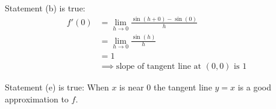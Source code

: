 \documentclass[nooutcomes]{ximera}
\renewenvironment{freeResponse}{
\ifhandout\setbox0\vbox\bgroup\else
\begin{trivlist}\item[\hskip \labelsep\bfseries Solution:\hspace{2ex}]
\fi}
{\ifhandout\egroup\else
\end{trivlist}
\fi}
\begin{document}
\begin{problem}
\begin{itemize}
\begin{freeResponse}
        Statement (b) is true:
        \begin{align*}
          f'(0) &= \lim_{h \to 0} \frac{\sin (h + 0) - \sin (0)}{h} \\
                &= \lim_{h \to 0} \frac{\sin (h)}{h} \\
                &= 1\\
          &\implies \mbox{slope of tangent line at $(0,0)$ is $1$}
        \end{align*}

        Statement (e) is true:
        When $x$ is near $0$ the tangent line $y = x$ is a good approximation to $f$.
      \end{freeResponse}

  \end{itemize}
\end{problem}
\end{document}
